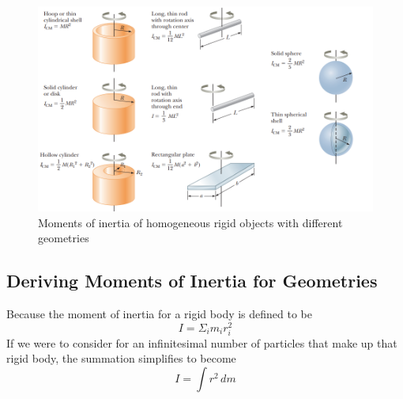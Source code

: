 \begin{figure}[ht!]
    \centering
    \includegraphics[width= \textwidth]{../figures/moments of inertia.png}
    \caption{Moments of inertia of homogeneous rigid objects with different geometries}
    \label{fig:moments-of-inertia}
\end{figure}

\subsection{Deriving Moments of Inertia for Geometries}
Because the moment of inertia for a rigid body is defined to be
\[
    I=\Sigma_im_ir_i^2
\]
If we were to consider for an infinitesimal number of particles that make up that rigid body, the
summation simplifies to become
\[
    I=\int r^2\,dm
\]

